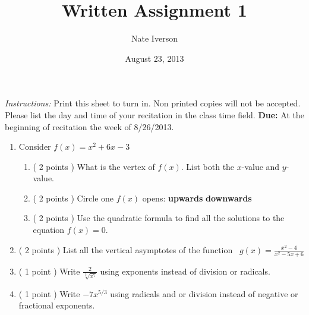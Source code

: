 \documentclass{quiz}
\title{Written Assignment 1}
\author{Nate Iverson}
\date{August 23, 2013} %
\begin{document}
\maketitle
%
\emph{Instructions:} Print this sheet to turn in. Non printed copies will not be accepted. Please list the day and time of your recitation  in the class time field. \textbf{Due:} At the beginning of recitation the week of 8/26/2013.
%
\begin{enumerate}
\item Consider $f(x)=x^2+6x-3$
\begin{enumerate}
\item ( 2 points ) What is the vertex of $f(x)$. List both the $x$-value and $y$-value.\\[.5in]
\item ( 2 points ) Circle one $f(x)$ opens: \hspace{.25in} \textbf{upwards} \hspace{.25in} \textbf{downwards}
\item ( 2 points ) Use the quadratic formula to find all the solutions to the equation $f(x)=0$.\\[.75in]
\end{enumerate}

\item ( 2 points ) List all the vertical asymptotes of the function \
$g(x)=\displaystyle \frac{x^2-4}{x^2-5x+6}$\\[1in]

\item ( 1 point ) Write $\displaystyle \frac{2}{\sqrt[3]{x^7}}$ using exponents instead of division or radicals.\\[1in]

\item ( 1 point ) Write $-7x^{5/3}$ using radicals and or division instead of negative or fractional exponents.
\end{enumerate}
\end{document}
